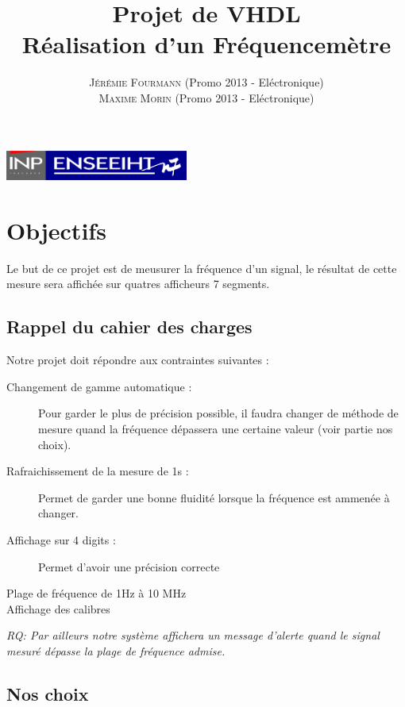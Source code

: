 \documentclass[a4paper,11pt]{article}
\title{\textbf{ \huge{Projet de VHDL}}  \\{\Large Réalisation d'un Fréquencemètre}}
\author{
\textsc{Jérémie Fourmann} (Promo 2013 - Eléctronique)\\ %
\textsc{Maxime Morin} (Promo 2013 - Eléctronique)\\ %
}
\begin{document}
\pagestyle{plain}

\maketitle
\begin{center}
\includegraphics[width=6cm]{inp-enseeiht.pdf}   
\end{center}

\vspace{1cm}
\renewcommand{\contentsname}{Plan}
\tableofcontents
\vspace{2cm}

\newpage
\section{Objectifs}
Le but de ce projet est de meusurer la fréquence d'un signal, le résultat de cette mesure sera affichée sur quatres afficheurs 7 segments.\\
\subsection{Rappel du cahier des charges}
Notre projet doit répondre aux contraintes suivantes :
\begin{description}
 \item[Changement de gamme automatique :] Pour garder le plus de précision possible, 
il faudra changer de méthode de mesure quand la fréquence dépassera une certaine valeur (voir partie nos choix).
\item[Rafraichissement de la mesure de 1s :] Permet de garder une bonne fluidité lorsque la fréquence est ammenée à changer.
\item[Affichage sur 4 digits :] Permet d'avoir une précision correcte
\item[Plage de fréquence de 1Hz à 10 MHz]
\item[Affichage des calibres]  
\end{description}
\vspace{.5cm}
\emph{RQ: Par ailleurs notre système affichera un message d'alerte quand le signal mesuré dépasse la plage de fréquence admise.}
\subsection{Nos choix}
\end{document}
